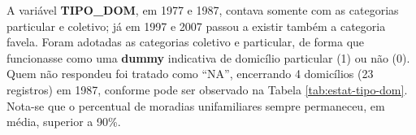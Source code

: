 %

\clearpage
A variável \textbf{TIPO_DOM}, em 1977 e 1987, contava somente com as categorias particular e coletivo; já em 1997 e 2007 passou a existir também a categoria favela. Foram adotadas as categorias coletivo e particular, de forma que funcionasse como uma \textbf{dummy} indicativa de domicílio particular (1) ou não (0). Quem não respondeu foi tratado como ``NA'', encerrando 4 domicílios (23 registros) em 1987, conforme pode ser observado na Tabela \ref{tab:estat-tipo-dom}. Nota-se que o percentual de moradias unifamiliares sempre permaneceu, em média, superior a 90\%.

\begin{table}[htb]
\centering

\end{table}

